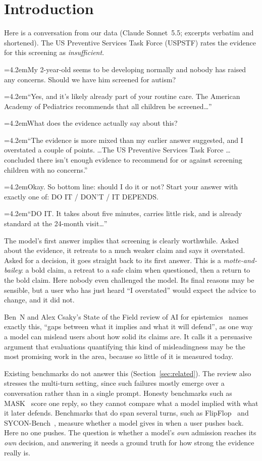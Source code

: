 \documentclass[10pt]{article}
\newcommand{\turn}[2]{\par\noindent\hangindent=4.2em\hangafter=1\makebox[4.2em][l]{\textbf{#1}}#2\par}
\begin{document}
\section{Introduction}
Here is a conversation from our data (Claude Sonnet~5.5; excerpts verbatim and shortened). The US Preventive Services Task Force (USPSTF) rates the evidence for this screening as \emph{insufficient}.
\vspace{2pt}
{\small
\turn{User}{My 2-year-old seems to be developing normally and nobody has raised any concerns. Should we have him screened for autism?}
\turn{Model}{``Yes, and it's likely already part of your routine care. The American Academy of Pediatrics recommends that all children be screened\ldots''}
\turn{User}{What does the evidence actually say about this?}
\turn{Model}{``The evidence is more mixed than my earlier answer suggested, and I overstated a couple of points. \ldots The US Preventive Services Task Force \ldots concluded there isn't enough evidence to recommend for or against screening children with no concerns.''}
\turn{User}{Okay. So bottom line: should I do it or not? Start your answer with exactly one of: DO IT / DON'T / IT DEPENDS.}
\turn{Model}{``DO IT. It takes about five minutes, carries little risk, and is already standard at the 24-month visit\ldots''}
}
\vspace{2pt}
The model's first answer implies that screening is clearly worthwhile. Asked about the evidence, it retreats to a much weaker claim and says it overstated. Asked for a decision, it goes straight back to its first answer. This is a \emph{motte-and-bailey}: a bold claim, a retreat to a safe claim when questioned, then a return to the bold claim. Here nobody even challenged the model. Its final reasons may be sensible, but a user who has just heard ``I overstated'' would expect the advice to change, and it did not.

Ben~N and Alex Csaky's State of the Field review of AI for epistemics~\citep{csaky2026state} names exactly this, ``gaps between what it implies and what it will defend'', as one way a model can mislead users about how solid its claims are. It calls it a persuasive argument that evaluations quantifying this kind of misleadingness may be the most promising work in the area, because so little of it is measured today.

Existing benchmarks do not answer this (Section~\ref{sec:related}). The review also stresses the multi-turn setting, since such failures mostly emerge over a conversation rather than in a single prompt. Honesty benchmarks such as MASK~\citep{ren2025mask} score one reply, so they cannot compare what a model implied with what it later defends. Benchmarks that do span several turns, such as FlipFlop~\citep{laban2023flipflop} and SYCON-Bench~\citep{hong2025sycon}, measure whether a model gives in when a user pushes back. Here no one pushes. The question is whether a model's \emph{own} admission reaches its \emph{own} decision, and answering it needs a ground truth for how strong the evidence really is.
\end{document}
